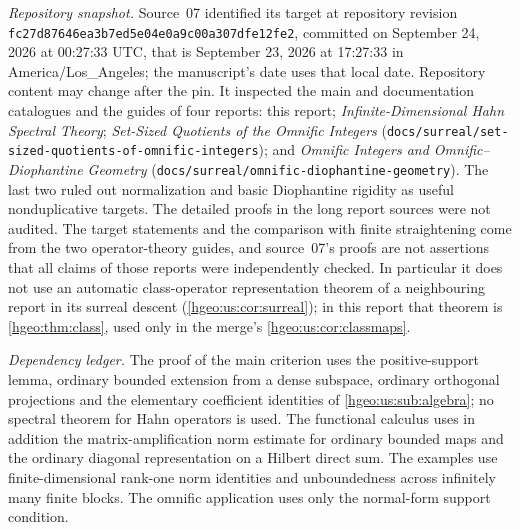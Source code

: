 \documentclass[11pt,letterpaper]{article}
\numberwithin{equation}{section}
\theoremstyle{definition}
\theoremstyle{remark}
\newcommand{\fn}[1]{\nolinkurl{#1}}
\begin{document}
\emph{Repository snapshot.} Source~07 identified its target at repository
revision \fn{fc27d87646ea3b7ed5e04e0a9c00a307dfe12fe2}, committed on
September 24, 2026 at 00:27:33 UTC, that is September 23, 2026 at 17:27:33 in
America/Los\_Angeles; the manuscript's date uses that local date. Repository
content may change after the pin. It inspected the main and documentation
catalogues and the guides of four reports: this report;
\emph{Infinite-Dimensional Hahn Spectral Theory}; \emph{Set-Sized Quotients of
the Omnific Integers} (\fn{docs/surreal/set-sized-quotients-of-omnific-integers});
and \emph{Omnific Integers and Omnific--Diophantine Geometry}
(\fn{docs/surreal/omnific-diophantine-geometry}). The last two ruled out
normalization and basic Diophantine rigidity as useful nonduplicative
targets. The detailed proofs in the long report sources were not audited. The
target statements and the comparison with finite straightening come from the
two operator-theory guides, and source~07's proofs are not assertions that
all claims of those reports were independently checked. In particular it does
not use an automatic class-operator representation theorem of a neighbouring
report in its surreal descent (\cref{hgeo:us:cor:surreal}); in this report that
theorem is \cref{hgeo:thm:class}, used only in the merge's
\cref{hgeo:us:cor:classmaps}.

\emph{Dependency ledger.} The proof of the main criterion uses the
positive-support lemma, ordinary bounded extension from a dense subspace,
ordinary orthogonal projections and the elementary coefficient identities of
\cref{hgeo:us:sub:algebra}; no spectral theorem for Hahn operators is used.
The functional calculus uses in addition the matrix-amplification norm
estimate for ordinary bounded maps and the ordinary diagonal representation on
a Hilbert direct sum. The examples use finite-dimensional rank-one norm
identities and unboundedness across infinitely many finite blocks. The omnific
application uses only the normal-form support condition.
\end{document}
